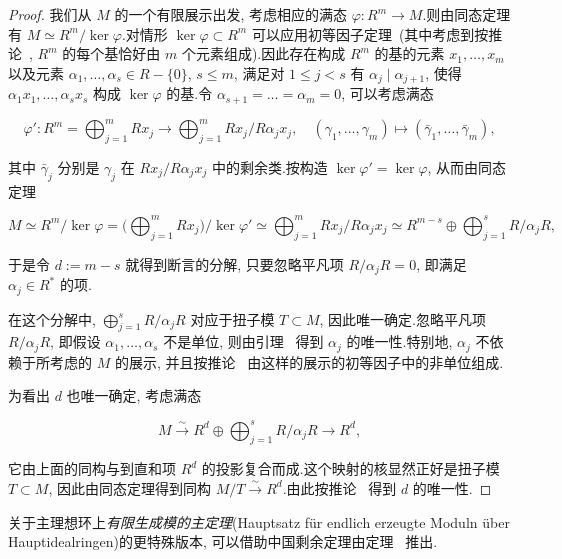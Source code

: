\begin{proof}
我们从 $M$ 的一个有限展示出发, 考虑相应的满态 $\varphi \colon R^m \longrightarrow M$.则由同态定理有 $M \simeq R^m/\ker \varphi$.对情形 $\ker \varphi \subset R^m$ 可以应用初等因子定理~(其中考虑到按推论~, $R^m$ 的每个基恰好由 $m$ 个元素组成).因此存在构成 $R^m$ 的基的元素 $x_1, \ldots, x_m$ 以及元素 $\alpha_1, \ldots, \alpha_s \in R - \{0\}$, $s \leq m$, 满足对 $1 \leq j < s$ 有 $\alpha_j \mid \alpha_{j + 1}$, 使得 $\alpha_1 x_1, \ldots, \alpha_s x_s$ 构成 $\ker \varphi$ 的基.令 $\alpha_{s + 1} = \ldots = \alpha_m = 0$, 可以考虑满态

\[
\varphi' \colon R^m = \bigoplus_{j = 1}^{m} R x_j \longrightarrow \bigoplus_{j = 1}^{m} R x_j/R\alpha_j x_j, \quad (\gamma_1, \ldots, \gamma_m) \longmapsto (\bar{\gamma}_1, \ldots, \bar{\gamma}_m),\]

其中 $\bar{\gamma}_j$ 分别是 $\gamma_j$ 在 $Rx_j/R\alpha_j x_j$ 中的剩余类.按构造 $\ker \varphi' = \ker \varphi$, 从而由同态定理

\[
M \simeq R^m/\ker \varphi = \Big(\bigoplus_{j = 1}^{m} R x_j\Big)/\ker \varphi' \simeq \bigoplus_{j = 1}^{m} R x_j/R\alpha_j x_j \simeq R^{m - s} \oplus \bigoplus_{j = 1}^{s} R/\alpha_j R,\]

于是令 $d := m - s$ 就得到断言的分解, 只要忽略平凡项 $R/\alpha_j R = 0$, 即满足 $\alpha_j \in R^*$ 的项.

在这个分解中, $\bigoplus_{j = 1}^{s} R/\alpha_j R$ 对应于扭子模 $T \subset M$, 因此唯一确定.忽略平凡项 $R/\alpha_j R$, 即假设 $\alpha_1, \ldots, \alpha_s$ 不是单位, 则由引理~ 得到 $\alpha_j$ 的唯一性.特别地, $\alpha_j$ 不依赖于所考虑的 $M$ 的展示, 并且按推论~ 由这样的展示的初等因子中的非单位组成.

为看出 $d$ 也唯一确定, 考虑满态

\[
M \xrightarrow{\sim} R^d \oplus \bigoplus_{j = 1}^{s} R/\alpha_j R \longrightarrow R^d,\]

它由上面的同构与到直和项 $R^d$ 的投影复合而成.这个映射的核显然正好是扭子模 $T \subset M$, 因此由同态定理得到同构 $M/T \xrightarrow{\sim} R^d$.由此按推论~ 得到 $d$ 的唯一性.
\end{proof}

关于主理想环上\emph{有限生成模的主定理}(\textup{Hauptsatz für endlich erzeugte Moduln über Hauptidealringen})的更特殊版本, 可以借助中国剩余定理由定理~ 推出.

